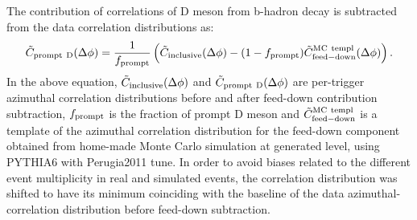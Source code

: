%
%
The contribution of correlations of D meson from b-hadron decay is subtracted from the data correlation distributions as:
\begin{equation}
\tilde{C}_{\rm prompt~D}(\Delta\phi)=\frac{1}{f_{\rm prompt}}\left(\tilde{C}_{\rm inclusive}(\Delta\phi)-(1-f_{\rm prompt})\tilde{C}_{\rm feed-down}^{\rm MC~templ}(\Delta\phi) \right).
\label{eqFeedDown}
\end{equation}
In the above equation, $\tilde{C}_{\rm inclusive}(\Delta\phi)$ and $\tilde{C}_{\rm prompt~D}(\Delta\phi)$ are per-trigger azimuthal correlation distributions before and after
feed-down contribution subtraction, $f_{\rm prompt}$ is the fraction of prompt D meson and $\tilde{C}_{\rm feed-down}^{\rm MC~templ}$ is a template
of the azimuthal correlation distribution for the feed-down component obtained from home-made Monte Carlo simulation at generated level, using PYTHIA6 with Perugia2011 tune.
In order to avoid biases related to the different event multiplicity in real and simulated events, the correlation distribution was shifted to have its minimum coinciding with the baseline of the data azimuthal-correlation distribution before feed-down subtraction. %

